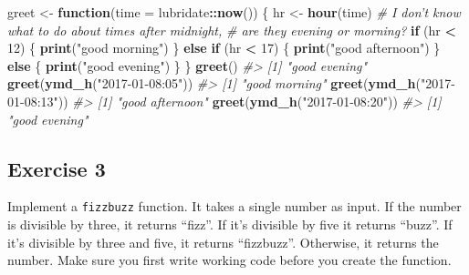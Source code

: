\documentclass[]{book}
\newenvironment{Shaded}{\begin{snugshade}}{\end{snugshade}}
\newcommand{\CommentTok}[1]{\textcolor[rgb]{0.56,0.35,0.01}{\textit{#1}}}
\newcommand{\ControlFlowTok}[1]{\textcolor[rgb]{0.13,0.29,0.53}{\textbf{#1}}}
\newcommand{\DataTypeTok}[1]{\textcolor[rgb]{0.13,0.29,0.53}{#1}}
\newcommand{\DecValTok}[1]{\textcolor[rgb]{0.00,0.00,0.81}{#1}}
\newcommand{\KeywordTok}[1]{\textcolor[rgb]{0.13,0.29,0.53}{\textbf{#1}}}
\newcommand{\NormalTok}[1]{#1}
\newcommand{\OperatorTok}[1]{\textcolor[rgb]{0.81,0.36,0.00}{\textbf{#1}}}
\newcommand{\StringTok}[1]{\textcolor[rgb]{0.31,0.60,0.02}{#1}}
\theoremstyle{definition}
\theoremstyle{definition}
\theoremstyle{definition}
\theoremstyle{remark}
\begin{document}
\begin{Shaded}
\begin{Highlighting}[]
\NormalTok{greet <-}\StringTok{ }\ControlFlowTok{function}\NormalTok{(}\DataTypeTok{time =}\NormalTok{ lubridate}\OperatorTok{::}\KeywordTok{now}\NormalTok{()) \{}
\NormalTok{  hr <-}\StringTok{ }\KeywordTok{hour}\NormalTok{(time)}
  \CommentTok{# I don't know what to do about times after midnight, }
  \CommentTok{# are they evening or morning?}
  \ControlFlowTok{if}\NormalTok{ (hr }\OperatorTok{<}\StringTok{ }\DecValTok{12}\NormalTok{) \{}
    \KeywordTok{print}\NormalTok{(}\StringTok{"good morning"}\NormalTok{)}
\NormalTok{  \} }\ControlFlowTok{else} \ControlFlowTok{if}\NormalTok{ (hr }\OperatorTok{<}\StringTok{ }\DecValTok{17}\NormalTok{) \{}
    \KeywordTok{print}\NormalTok{(}\StringTok{"good afternoon"}\NormalTok{)}
\NormalTok{  \} }\ControlFlowTok{else}\NormalTok{ \{}
    \KeywordTok{print}\NormalTok{(}\StringTok{"good evening"}\NormalTok{)}
\NormalTok{  \}}
\NormalTok{\} }
\KeywordTok{greet}\NormalTok{()}
\CommentTok{#> [1] "good evening"}
\KeywordTok{greet}\NormalTok{(}\KeywordTok{ymd_h}\NormalTok{(}\StringTok{"2017-01-08:05"}\NormalTok{))}
\CommentTok{#> [1] "good morning"}
\KeywordTok{greet}\NormalTok{(}\KeywordTok{ymd_h}\NormalTok{(}\StringTok{"2017-01-08:13"}\NormalTok{))}
\CommentTok{#> [1] "good afternoon"}
\KeywordTok{greet}\NormalTok{(}\KeywordTok{ymd_h}\NormalTok{(}\StringTok{"2017-01-08:20"}\NormalTok{))}
\CommentTok{#> [1] "good evening"}
\end{Highlighting}
\end{Shaded}

\hypertarget{exercise-3-33}{%
\subsection{Exercise 3}\label{exercise-3-33}}

Implement a \texttt{fizzbuzz} function. It takes a single number as
input. If the number is divisible by three, it returns ``fizz''. If it's
divisible by five it returns ``buzz''. If it's divisible by three and
five, it returns ``fizzbuzz''. Otherwise, it returns the number. Make
sure you first write working code before you create the function.
\end{document}
